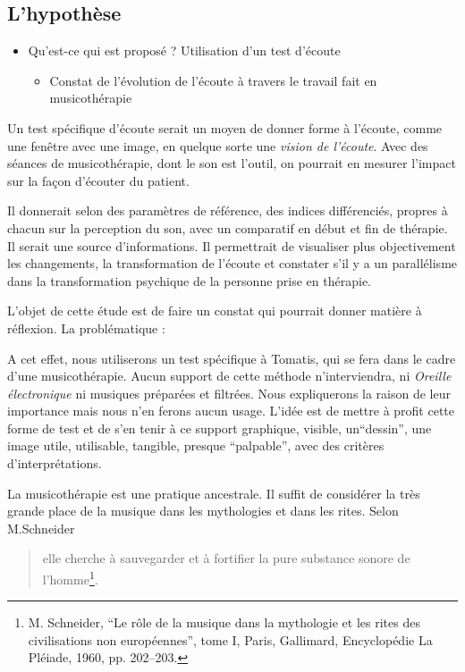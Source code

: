 \subsection{L'hypothèse}

\begin{itemize}
	\item Qu'est-ce qui est proposé ? 
	Utilisation d'un test d'écoute 
	\begin{itemize}
		\item Constat de l'évolution de l'écoute à travers le travail fait en musicothérapie
	\end{itemize}
\end{itemize}


Un test spécifique d'écoute serait  un 
moyen de donner  forme à l'écoute, comme une fenêtre avec une  image, en quelque sorte une \emph{vision de l'écoute}. Avec  des séances de musicothérapie, dont  le son est l'outil, on pourrait en mesurer l'impact sur la façon d'écouter du patient. 

Il  donnerait selon des paramètres de référence, des indices différenciés, propres à chacun sur la perception du son, avec un comparatif en début et fin de thérapie. Il serait  une source d'informations. Il permettrait de visualiser plus objectivement
les changements, la transformation de l'écoute et constater s'il y a un parallélisme dans la transformation psychique  de la personne prise en thérapie.


 L'objet de cette étude est de faire un constat
qui pourrait donner matière à réflexion.
La problématique : 

A cet effet, nous utiliserons un test spécifique à Tomatis, qui se fera dans le cadre d'une musicothérapie. Aucun support de cette méthode n'interviendra, ni \textsl{Oreille
électronique} ni musiques préparées et filtrées. Nous expliquerons la raison de   leur importance mais nous n'en ferons aucun usage. L'idée est de mettre à profit cette forme de test et de  s'en tenir à ce support
graphique, visible, un``dessin'', une image utile, utilisable, tangible,
presque ``palpable'', avec des critères
d'interprétations.


La musicothérapie est une pratique ancestrale. Il suffit de considérer la très grande  place de la musique dans les mythologies et dans les rites.  Selon M.Schneider
\begin{quote}
	elle cherche à sauvegarder et à fortifier la pure substance sonore de l'homme\footnote{M. Schneider, ``Le rôle  de la musique dans 
		la mythologie et les rites des civilisations non européennes'',
	tome I, Paris, Gallimard, Encyclopédie La Pléiade, 1960, pp. 202--203.}.
\end{quote}

